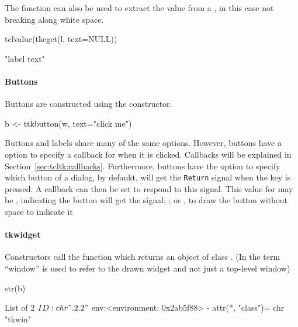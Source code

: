 The  function can also be used to extract the
value from a , in this case not breaking along white
space.
\begin{Schunk}
\begin{Sinput}
 tclvalue(tkcget(l, text=NULL))
\end{Sinput}
\begin{Soutput}
[1] "label text"
\end{Soutput}
\end{Schunk}



\paragraph{Buttons}
Buttons are constructed using the  constructor.
\begin{Schunk}
\begin{Sinput}
 b <- ttkbutton(w, text="click me")
\end{Sinput}
\end{Schunk}

Buttons and labels share many of the same options. However, buttons
have a  option to specify a callback for
when it is clicked. Callbacks will be explained in
Section~\ref{sec:tcltk:callbacks}.  Furthermore, buttons have the
option  to specify which button of a
dialog, by defaukt, will get the \texttt{Return} signal when the  key is
pressed. A callback can then be set to respond to this signal. This
value for  may be , indicating the button
will get the signal; ; or , to draw the
button without space to indicate it


\paragraph{tkwidget}
Constructors call the  function which returns an
object of class . (In \TK\/ the term ``window'' is used to
refer to the drawn widget and not just a top-level window)

\begin{Schunk}
\begin{Sinput}
 str(b)
\end{Sinput}
\begin{Soutput}
List of 2
 $ ID : chr ".2.2"
 $ env:<environment: 0x2ab5f88> 
 - attr(*, "class")= chr "tkwin"
\end{Soutput}
\end{Schunk}

